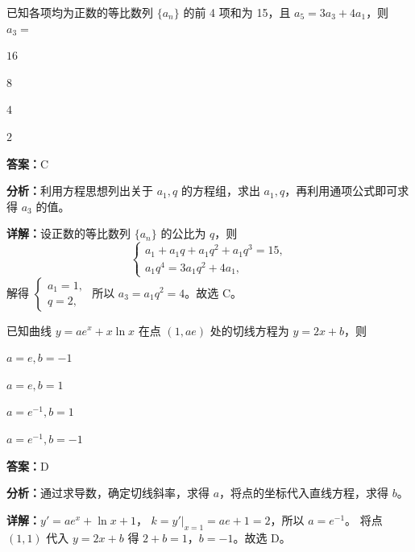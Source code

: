 \begin{question}[points=5]
已知各项均为正数的等比数列 $\{a_n\}$ 的前 4 项和为 15，且 $a_5=3a_3+4a_1$，则 $a_3=$
\begin{choices}
  \item $16$
  \item $8$
  \item $4$
  \item $2$
\end{choices}
\begin{solution}
\textbf{答案：}C

\textbf{分析：}利用方程思想列出关于 $a_1,q$ 的方程组，求出 $a_1,q$，再利用通项公式即可求得 $a_3$ 的值。

\textbf{详解：}设正数的等比数列 $\{a_n\}$ 的公比为 $q$，则
$$\begin{cases} a_1 + a_1q + a_1q^2 + a_1q^3 = 15, \\ a_1q^4 = 3a_1q^2 + 4a_1, \end{cases}$$
解得 $\begin{cases} a_1 = 1, \\ q = 2, \end{cases}$ 所以 $a_3 = a_1q^2 = 4$。故选 C。
\end{solution}
\end{question}

\begin{question}[points=5]
已知曲线 $y = ae^x + x\ln x$ 在点 $(1,ae)$ 处的切线方程为 $y=2x+b$，则
\begin{choices}
  \item $a=e, b=-1$
  \item $a=e, b=1$
  \item $a=e^{-1}, b=1$
  \item $a=e^{-1}, b=-1$
\end{choices}
\begin{solution}
\textbf{答案：}D

\textbf{分析：}通过求导数，确定切线斜率，求得 $a$，将点的坐标代入直线方程，求得 $b$。

\textbf{详解：}$y' = ae^x + \ln x + 1$，
$k = y'|_{x=1} = ae + 1 = 2$，所以 $a = e^{-1}$。
将点 $(1,1)$ 代入 $y=2x+b$ 得 $2+b=1$，$b=-1$。故选 D。
\end{solution}
\end{question}

